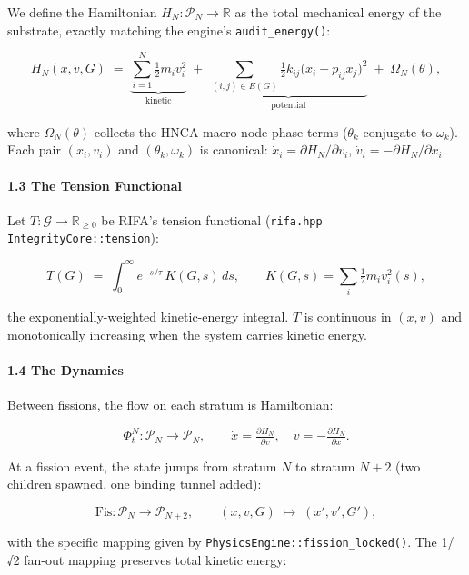 \documentclass[
  11pt,
  a4paper,
]{article}
\begin{document}
We define the Hamiltonian \(H_N: \mathcal{P}_N \to \mathbb{R}\) as the
total mechanical energy of the substrate, exactly matching the engine's
\texttt{audit\_energy()}:

\[
H_N(x, v, G) \;=\; \underbrace{\sum_{i=1}^{N} \tfrac{1}{2} m_i v_i^2}_{\text{kinetic}}
                 \;+\; \underbrace{\sum_{(i,j) \in E(G)} \tfrac{1}{2} k_{ij} \big(x_i - p_{ij} x_j\big)^2}_{\text{potential}}
                 \;+\; \Omega_N(\theta),
\]

where \(\Omega_N(\theta)\) collects the HNCA macro-node phase terms
(\(\theta_k\) conjugate to \(\omega_k\)). Each pair \((x_i, v_i)\) and
\((\theta_k, \omega_k)\) is canonical:
\(\dot{x}_i = \partial H_N / \partial v_i\),
\(\dot{v}_i = -\partial H_N / \partial x_i\).

\paragraph{1.3 The Tension Functional}\label{the-tension-functional}

Let \(T: \mathcal{G} \to \mathbb{R}_{\geq 0}\) be RIFA's tension
functional (\texttt{rifa.hpp} \texttt{IntegrityCore::tension}):

\[
T(G) \;=\; \int_0^\infty e^{-s/\tau} \, K(G, s) \, ds, \qquad K(G, s) = \sum_i \tfrac{1}{2} m_i v_i^2(s),
\]

the exponentially-weighted kinetic-energy integral. \(T\) is continuous
in \((x, v)\) and monotonically increasing when the system carries
kinetic energy.

\paragraph{1.4 The Dynamics}\label{the-dynamics}

Between fissions, the flow on each stratum is Hamiltonian:

\[
\Phi_t^N: \mathcal{P}_N \to \mathcal{P}_N,
\qquad
\dot{x} = \tfrac{\partial H_N}{\partial v}, \quad
\dot{v} = -\tfrac{\partial H_N}{\partial x}.
\]

At a fission event, the state jumps from stratum \(N\) to stratum
\(N+2\) (two children spawned, one binding tunnel added):

\[
\text{Fis}: \mathcal{P}_N \to \mathcal{P}_{N+2},
\qquad
(x, v, G) \;\mapsto\; (x', v', G'),
\]

with the specific mapping given by
\texttt{PhysicsEngine::fission\_locked()}. The 1/√2 fan-out mapping
preserves total kinetic energy:
\end{document}
